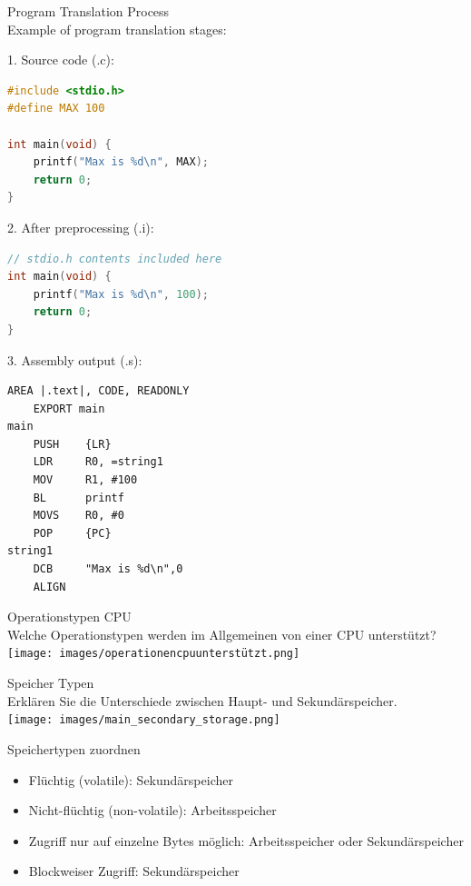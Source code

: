 \begin{example2}{Program Translation Process}\\
Example of program translation stages:

1. Source code (.c):
\begin{lstlisting}[language=C, style=basesmol]
#include <stdio.h>
#define MAX 100

int main(void) {
    printf("Max is %d\n", MAX);
    return 0;
}
\end{lstlisting}

2. After preprocessing (.i):
\begin{lstlisting}[language=C, style=basesmol]
// stdio.h contents included here
int main(void) {
    printf("Max is %d\n", 100);
    return 0;
}
\end{lstlisting}

3. Assembly output (.s):
\begin{lstlisting}[language=armasm, style=basesmol]
    AREA |.text|, CODE, READONLY
    EXPORT main
main
    PUSH    {LR}
    LDR     R0, =string1
    MOV     R1, #100
    BL      printf
    MOVS    R0, #0
    POP     {PC}
string1
    DCB     "Max is %d\n",0
    ALIGN
\end{lstlisting}
\end{example2}

\begin{example2}{Operationstypen CPU}\\
Welche Operationstypen werden im Allgemeinen von einer CPU unterstützt?\\
\texttt{[image: images/operationencpuunterstützt.png]}
\end{example2}

\begin{example2}{Speicher Typen}\\
Erklären Sie die Unterschiede zwischen Haupt- und Sekundärspeicher.\\
\texttt{[image: images/main\_secondary\_storage.png]}
\end{example2}

\begin{example2}{Speichertypen zuordnen}\\
\begin{itemize}
  \item Flüchtig (volatile): Sekundärspeicher
  \item Nicht-flüchtig (non-volatile): Arbeitsspeicher
  \item Zugriff nur auf einzelne Bytes möglich: Arbeitsspeicher oder Sekundärspeicher
  \item Blockweiser Zugriff: Sekundärspeicher
\end{itemize}

\end{example2}

